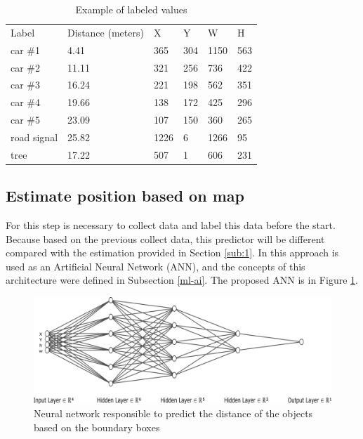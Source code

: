 \begin{table}[H]
\centering
\caption{Example of labeled values}
\begin{tabular}{llllll} 
\hline
Label        & Distance (meters) & X    & Y   & W    & H   \\
car \#1         & 4.41     & 365  & 304 & 1150 & 563  \\
car \#2        & 11.11    & 321  & 256 & 736  & 422  \\
car \#3        & 16.24    & 221  & 198 & 562  & 351  \\
car \#4        & 19.66    & 138  & 172 & 425  & 296  \\
car \#5        & 23.09    & 107  & 150 & 360  & 265  \\
road signal & 25.82    & 1226 & 6   & 1266 & 95   \\
tree        & 17.22    & 507  & 1   & 606  & 231  \\
\hline
\end{tabular}
 \label{tab:output_table}
\end{table}

\subsection{Estimate position based on map}

For this step is necessary to collect data and label this data before the start. Because based on the previous collect data, this predictor will be different compared with the estimation provided in Section \ref{sub:1}. In this approach is used as an Artificial Neural Network (ANN), and the concepts of this architecture were defined in 
Subsection \ref{ml-ai}. The proposed ANN is in Figure \ref{fig:rede_neural}.


\begin{figure}[H]
\centering
\includegraphics[width=\textwidth]{imagens/nn.png}
\caption{Neural network responsible to predict the distance of the objects based on the boundary boxes}
\label{fig:rede_neural}
\end{figure}

